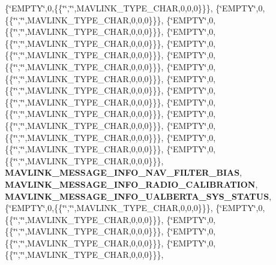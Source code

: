 \{\char`\"{}E\+M\+P\+TY\char`\"{},0,\{\{\char`\"{}\char`\"{},\char`\"{}\char`\"{},M\+A\+V\+L\+I\+N\+K\+\_\+\+T\+Y\+P\+E\+\_\+\+C\+H\+AR,0,0,0\}\}\}, \{\char`\"{}E\+M\+P\+TY\char`\"{},0,\{\{\char`\"{}\char`\"{},\char`\"{}\char`\"{},M\+A\+V\+L\+I\+N\+K\+\_\+\+T\+Y\+P\+E\+\_\+\+C\+H\+AR,0,0,0\}\}\}, \{\char`\"{}E\+M\+P\+TY\char`\"{},0,\{\{\char`\"{}\char`\"{},\char`\"{}\char`\"{},M\+A\+V\+L\+I\+N\+K\+\_\+\+T\+Y\+P\+E\+\_\+\+C\+H\+AR,0,0,0\}\}\}, \{\char`\"{}E\+M\+P\+TY\char`\"{},0,\{\{\char`\"{}\char`\"{},\char`\"{}\char`\"{},M\+A\+V\+L\+I\+N\+K\+\_\+\+T\+Y\+P\+E\+\_\+\+C\+H\+AR,0,0,0\}\}\}, \{\char`\"{}E\+M\+P\+TY\char`\"{},0,\{\{\char`\"{}\char`\"{},\char`\"{}\char`\"{},M\+A\+V\+L\+I\+N\+K\+\_\+\+T\+Y\+P\+E\+\_\+\+C\+H\+AR,0,0,0\}\}\}, \{\char`\"{}E\+M\+P\+TY\char`\"{},0,\{\{\char`\"{}\char`\"{},\char`\"{}\char`\"{},M\+A\+V\+L\+I\+N\+K\+\_\+\+T\+Y\+P\+E\+\_\+\+C\+H\+AR,0,0,0\}\}\}, \{\char`\"{}E\+M\+P\+TY\char`\"{},0,\{\{\char`\"{}\char`\"{},\char`\"{}\char`\"{},M\+A\+V\+L\+I\+N\+K\+\_\+\+T\+Y\+P\+E\+\_\+\+C\+H\+AR,0,0,0\}\}\}, \{\char`\"{}E\+M\+P\+TY\char`\"{},0,\{\{\char`\"{}\char`\"{},\char`\"{}\char`\"{},M\+A\+V\+L\+I\+N\+K\+\_\+\+T\+Y\+P\+E\+\_\+\+C\+H\+AR,0,0,0\}\}\}, \{\char`\"{}E\+M\+P\+TY\char`\"{},0,\{\{\char`\"{}\char`\"{},\char`\"{}\char`\"{},M\+A\+V\+L\+I\+N\+K\+\_\+\+T\+Y\+P\+E\+\_\+\+C\+H\+AR,0,0,0\}\}\}, \{\char`\"{}E\+M\+P\+TY\char`\"{},0,\{\{\char`\"{}\char`\"{},\char`\"{}\char`\"{},M\+A\+V\+L\+I\+N\+K\+\_\+\+T\+Y\+P\+E\+\_\+\+C\+H\+AR,0,0,0\}\}\}, \{\char`\"{}E\+M\+P\+TY\char`\"{},0,\{\{\char`\"{}\char`\"{},\char`\"{}\char`\"{},M\+A\+V\+L\+I\+N\+K\+\_\+\+T\+Y\+P\+E\+\_\+\+C\+H\+AR,0,0,0\}\}\}, \{\char`\"{}E\+M\+P\+TY\char`\"{},0,\{\{\char`\"{}\char`\"{},\char`\"{}\char`\"{},M\+A\+V\+L\+I\+N\+K\+\_\+\+T\+Y\+P\+E\+\_\+\+C\+H\+AR,0,0,0\}\}\}, \{\char`\"{}E\+M\+P\+TY\char`\"{},0,\{\{\char`\"{}\char`\"{},\char`\"{}\char`\"{},M\+A\+V\+L\+I\+N\+K\+\_\+\+T\+Y\+P\+E\+\_\+\+C\+H\+AR,0,0,0\}\}\}, \{\char`\"{}E\+M\+P\+TY\char`\"{},0,\{\{\char`\"{}\char`\"{},\char`\"{}\char`\"{},M\+A\+V\+L\+I\+N\+K\+\_\+\+T\+Y\+P\+E\+\_\+\+C\+H\+AR,0,0,0\}\}\}, \textbf{ M\+A\+V\+L\+I\+N\+K\+\_\+\+M\+E\+S\+S\+A\+G\+E\+\_\+\+I\+N\+F\+O\+\_\+\+N\+A\+V\+\_\+\+F\+I\+L\+T\+E\+R\+\_\+\+B\+I\+AS}, \textbf{ M\+A\+V\+L\+I\+N\+K\+\_\+\+M\+E\+S\+S\+A\+G\+E\+\_\+\+I\+N\+F\+O\+\_\+\+R\+A\+D\+I\+O\+\_\+\+C\+A\+L\+I\+B\+R\+A\+T\+I\+ON}, \textbf{ M\+A\+V\+L\+I\+N\+K\+\_\+\+M\+E\+S\+S\+A\+G\+E\+\_\+\+I\+N\+F\+O\+\_\+\+U\+A\+L\+B\+E\+R\+T\+A\+\_\+\+S\+Y\+S\+\_\+\+S\+T\+A\+T\+US}, \{\char`\"{}E\+M\+P\+TY\char`\"{},0,\{\{\char`\"{}\char`\"{},\char`\"{}\char`\"{},M\+A\+V\+L\+I\+N\+K\+\_\+\+T\+Y\+P\+E\+\_\+\+C\+H\+AR,0,0,0\}\}\}, \{\char`\"{}E\+M\+P\+TY\char`\"{},0,\{\{\char`\"{}\char`\"{},\char`\"{}\char`\"{},M\+A\+V\+L\+I\+N\+K\+\_\+\+T\+Y\+P\+E\+\_\+\+C\+H\+AR,0,0,0\}\}\}, \{\char`\"{}E\+M\+P\+TY\char`\"{},0,\{\{\char`\"{}\char`\"{},\char`\"{}\char`\"{},M\+A\+V\+L\+I\+N\+K\+\_\+\+T\+Y\+P\+E\+\_\+\+C\+H\+AR,0,0,0\}\}\}, \{\char`\"{}E\+M\+P\+TY\char`\"{},0,\{\{\char`\"{}\char`\"{},\char`\"{}\char`\"{},M\+A\+V\+L\+I\+N\+K\+\_\+\+T\+Y\+P\+E\+\_\+\+C\+H\+AR,0,0,0\}\}\}, \{\char`\"{}E\+M\+P\+TY\char`\"{},0,\{\{\char`\"{}\char`\"{},\char`\"{}\char`\"{},M\+A\+V\+L\+I\+N\+K\+\_\+\+T\+Y\+P\+E\+\_\+\+C\+H\+AR,0,0,0\}\}\}, 